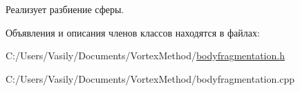 Реализует разбиение сферы. 

Объявления и описания членов классов находятся в файлах\+:\begin{DoxyCompactItemize}
\item 
C\+:/\+Users/\+Vasily/\+Documents/\+Vortex\+Method/\mbox{\hyperlink{bodyfragmentation_8h}{bodyfragmentation.\+h}}\item 
C\+:/\+Users/\+Vasily/\+Documents/\+Vortex\+Method/bodyfragmentation.\+cpp\end{DoxyCompactItemize}
